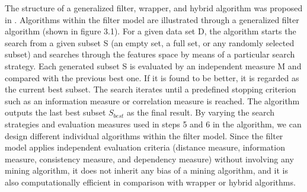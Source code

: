 \documentclass[a4paper,fleqn]{report}
\begin{document}
The structure of a generalized filter, wrapper, and hybrid algorithm was proposed in \cite{HuanLiu2005}. 
Algorithms within the filter model are illustrated through a generalized filter algorithm 
(shown in figure 3.1). %
For a given data set D, the algorithm starts the search from 
a given subset S (an empty set, a full set, or any randomly selected subset) and searches through the features space by means of 
a particular search strategy. Each generated subset S is evaluated by an independent measure M
and compared with the previous best one. If it is found to be better, it is regarded as the current
best subset. The search iterates until a predefined stopping criterion such as an information measure or correlation measure 
is reached. The algorithm outputs the last best subset $S_{best}$ as the final result. By varying
the search strategies and evaluation measures used in steps 5 and 6 in the algorithm, we can design
different individual algorithms within the filter model. Since the filter model applies independent
evaluation criteria (distance measure, information measure, consistency measure, and dependency measure) 
without involving any mining algorithm, it does not inherit any bias of a mining algorithm, and it is 
also computationally efficient in comparison with wrapper or hybrid algorithms. 
\end{document}
